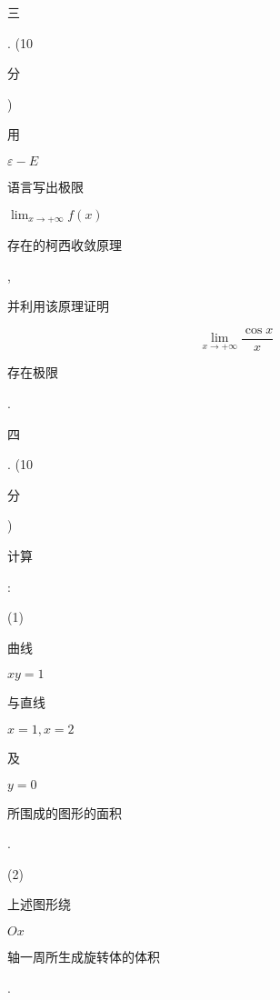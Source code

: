 \documentclass[10pt]{article}
\begin{document}
\begin{CJK}{UTF8}{mj}三\end{CJK}. (10 \begin{CJK}{UTF8}{mj}分\end{CJK}) \begin{CJK}{UTF8}{mj}用\end{CJK} $\varepsilon-E$ \begin{CJK}{UTF8}{mj}语言写出极限\end{CJK} $\lim _{x \rightarrow+\infty} f(x)$ \begin{CJK}{UTF8}{mj}存在的柯西收敛原理\end{CJK}, \begin{CJK}{UTF8}{mj}并利用该原理证明\end{CJK}
$$
\lim _{x \rightarrow+\infty} \frac{\cos x}{x}
$$
\begin{CJK}{UTF8}{mj}存在极限\end{CJK}.

\begin{CJK}{UTF8}{mj}四\end{CJK}. (10 \begin{CJK}{UTF8}{mj}分\end{CJK}) \begin{CJK}{UTF8}{mj}计算\end{CJK}:

(1) \begin{CJK}{UTF8}{mj}曲线\end{CJK} $x y=1$ \begin{CJK}{UTF8}{mj}与直线\end{CJK} $x=1, x=2$ \begin{CJK}{UTF8}{mj}及\end{CJK} $y=0$ \begin{CJK}{UTF8}{mj}所围成的图形的面积\end{CJK}.

(2) \begin{CJK}{UTF8}{mj}上述图形绕\end{CJK} $O x$ \begin{CJK}{UTF8}{mj}轴一周所生成旋转体的体积\end{CJK}.
\end{document}
